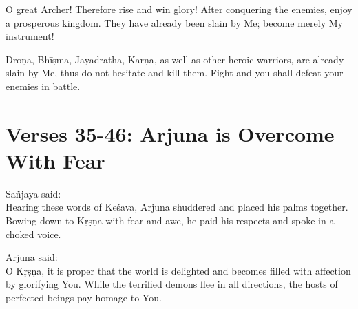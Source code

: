 {O great Archer! Therefore rise and win glory! After conquering the enemies, enjoy a prosperous kingdom. They have already been slain by Me; become merely My instrument!}

{Droṇa, Bhīṣma, Jayadratha, Karṇa, as well as other heroic warriors, are already slain by Me, thus do not hesitate and kill them. Fight and you shall defeat your enemies in battle.}

\newpage
\section{Verses 35-46: Arjuna is Overcome With Fear}\label{sec-verses-35-46-arjuna-is-overcome-with-fear}

{\hspace*{1em}Sañjaya said: \\
Hearing these words of Keśava, Arjuna shuddered and placed his palms together. Bowing down to Kṛṣṇa with fear and awe, he paid his respects and spoke in a choked voice.}

{\hspace*{1em}Arjuna said: \\
O Kṛṣṇa, it is proper that the world is delighted and becomes filled with affection by glorifying You. While the terrified demons flee in all directions, the hosts of perfected beings pay homage to You.}

